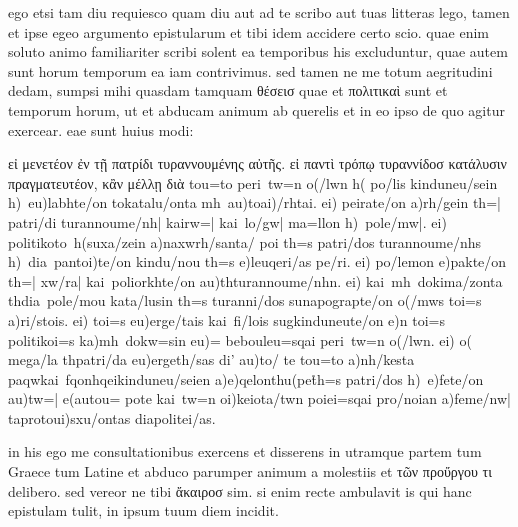 


 ego etsi tam diu requiesco quam diu aut ad te scribo aut tuas litteras lego, tamen et ipse egeo argumento epistularum et tibi idem accidere certo scio. quae enim soluto animo familiariter scribi solent ea temporibus his excluduntur, quae autem sunt horum temporum ea iam contrivimus. sed tamen ne me totum aegritudini dedam, sumpsi mihi quasdam tamquam θέσεισ quae et πολιτικαὶ sunt et temporum horum, ut et abducam animum ab querelis et in eo ipso de quo agitur exercear. eae sunt huius modi:

 εἰ μενετέον ἐν τῇ πατρίδι τυραννουμένης αὐτῆς. εἰ παντὶ τρόπῳ τυραννίδοσ κατάλυσιν πραγματευτέον, κἂν μέλλῃ διὰ tou=to peri\ tw=n o(/lwn h( po/lis kinduneu/sein h)\ eu)labhte/on to\n katalu/onta mh\ au)to\s ai)/rhtai. ei) peirate/on a)rh/gein th=| patri/di turannoume/nh| kairw=| kai\ lo/gw| ma=llon h)\ pole/mw|. ei) politiko\n to\ h(suxa/zein a)naxwrh/santa/ poi th=s patri/dos turannoume/nhs h)\ dia\ panto\s i)te/on kindu/nou th=s e)leuqeri/as pe/ri. ei) po/lemon e)pakte/on th=| xw/ra| kai\ poliorkhte/on au)th\n turannoume/nhn. ei) kai\ mh\ dokima/zonta th\n dia\ pole/mou kata/lusin th=s turanni/dos sunapograpte/on o(/mws toi=s a)ri/stois. ei) toi=s eu)erge/tais kai\ fi/lois sugkinduneute/on e)n toi=s politikoi=s ka)\n mh\ dokw=sin eu)= bebouleu=sqai peri\ tw=n o(/lwn. ei) o( mega/la th\n patri/da eu)ergeth/sas di' au)to/ te tou=to a)nh/kesta paqw\n kai\ fqonhqei\s kinduneu/seien a)\n e)qelonth\s u(pe\r th=s patri/dos h)\ e)fete/on au)tw=| e(autou= pote kai\ tw=n oi)keiota/twn poiei=sqai pro/noian a)feme/nw| ta\s pro\s tou\s i)sxu/ontas diapolitei/as.

 in his ego me consultationibus exercens et disserens in utramque partem tum Graece tum Latine et abduco parumper animum a molestiis et τῶν προὔργου τι delibero. sed vereor ne tibi ἄκαιροσ sim. si enim recte ambulavit is qui hanc epistulam tulit, in ipsum tuum diem incidit.
